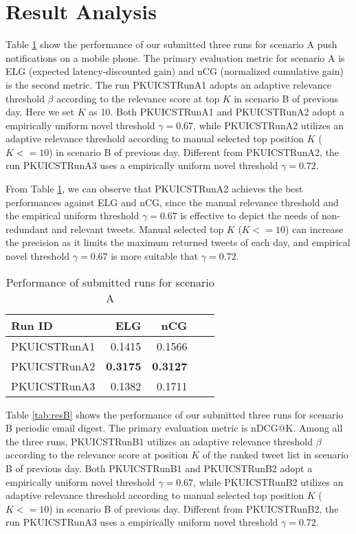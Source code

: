 \section{Result Analysis}
Table \ref{tab:resA} show the performance of our submitted three runs for scenario A push notifications on a mobile phone. 
The primary evaluation metric for scenario A is ELG (expected latency-discounted gain) and nCG (normalized cumulative gain) is the second metric.
The run PKUICSTRunA1 adopts an adaptive relevance threshold $\beta$ according to the relevance score at top $K$ in scenario B of previous day. Here we set $K$ as 10. Both PKUICSTRunA1 and PKUICSTRunA2 adopt a empirically uniform novel threshold $\gamma=0.67$, while PKUICSTRunA2 utilizes an adaptive relevance threshold according to manual selected top position $K$ ($K<=10$) in scenario B of previous day. Different from PKUICSTRunA2, the run PKUICSTRunA3 uses a empirically uniform novel threshold $\gamma=0.72$.

From Table \ref{tab:resA}, we can observe that PKUICSTRunA2 achieves the best performances against ELG and nCG, since the manual relevance threshold and the empirical uniform threshold $\gamma=0.67$ is effective to depict the needs of non-redundant and relevant tweets. Manual selected top $K$ ($K<=10$) can increase the precision as it limits the maximum returned tweets of each day, and empirical novel threshold $\gamma=0.67$ is more suitable that $\gamma=0.72$. 
\begin{table}[htbp]
\centering
\caption{Performance of submitted runs for scenario A}
\label{tab:resA}
\begin{tabular}{lrrrr}
\hline
Run ID&ELG&nCG\\
\hline
PKUICSTRunA1&0.1415&0.1566\\
PKUICSTRunA2&\textbf{0.3175}&\textbf{0.3127}\\
PKUICSTRunA3&0.1382&0.1711\\
\hline
\end{tabular}
\end{table}

Table \ref{tab:resB} shows the performance of our submitted three runs for scenario B periodic email digest. 
The primary evaluation metric is nDCG@K. 
Among all the three runs,
PKUICSTRunB1 utilizes an adaptive relevance threshold $\beta$ according to the relevance score at position $K$ of the ranked tweet list in scenario B of previous day. 
Both PKUICSTRunB1 and PKUICSTRunB2 adopt a empirically uniform novel threshold $\gamma=0.67$, while PKUICSTRunB2 utilizes an adaptive relevance threshold according to manual selected top position $K$ ($K<=10$) in scenario B of previous day. Different from PKUICSTRunB2, the run PKUICSTRunA3 uses a empirically uniform novel threshold $\gamma=0.72$.

